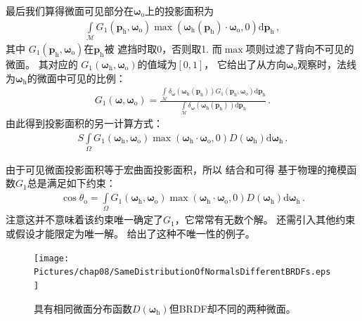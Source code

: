 最后我们算得微面可见部分在${\bm\omega}_{\mathrm{o}}$上的投影面积为
\begin{align}\label{eq:08ex01-AreaProjectionsMicrofacetVisible}
    \int\limits_{\mathcal{M}}G_1({\bm p}_{\mathrm{h}},{\bm\omega}_{\mathrm{o}})
    \max({\bm\omega}_{\mathrm{h}}({\bm p}_{\mathrm{h}})\cdot{\bm\omega}_{\mathrm{o}},0)
    \mathrm{d}{\bm p}_{\mathrm{h}}\, ,
\end{align}
其中
$G_1({\bm p}_{\mathrm{h}},{\bm\omega}_{\mathrm{o}})$在${\bm p}_{\mathrm{h}}$被
遮挡时取0，否则取1. 而$\max$项则过滤了背向不可见的微面。
其对应的
$G_1({\bm\omega}_{\mathrm{h}},{\bm\omega}_{\mathrm{o}})$的值域为$[0,1]$，
它给出了从方向${\bm\omega}_{\mathrm{o}}$观察时，法线为${\bm\omega}_{\mathrm{h}}$的微面中可见的比例：
\begin{align}\label{eq:08ex01-StaticMaskFunc}
    G_1({\bm\omega},{\bm\omega}_{\mathrm{o}})
    =\frac{\displaystyle\int\limits_{\mathcal{M}}
    \delta_{\bm\omega}({\bm\omega}_{\mathrm{h}}({\bm p}_{\mathrm{h}}))
    G_1({\bm p}_{\mathrm{h}},{\bm\omega}_{\mathrm{o}})\mathrm{d}{\bm p}_{\mathrm{h}}}
    {\displaystyle\int\limits_{\mathcal{M}}
    \delta_{\bm\omega}({\bm\omega}_{\mathrm{h}}({\bm p}_{\mathrm{h}}))
    \mathrm{d}{\bm p}_{\mathrm{h}}}\, .
\end{align}
由此得到投影面积的另一计算方式：
\begin{align}
    \label{eq:08ex01-AreaMicrosurface}
    S\int\limits_{\varOmega}G_1({\bm\omega}_{\mathrm{h}},{\bm\omega}_{\mathrm{o}})
    \max({\bm\omega}_{\mathrm{h}}\cdot{\bm\omega}_{\mathrm{o}},0)
    D({\bm\omega}_{\mathrm{h}})\mathrm{d}{\bm\omega}_{\mathrm{h}}\, .
\end{align}

由于可见微面投影面积等于宏曲面投影面积，所以
结合和可得
基于物理的掩模函数$G_1$总是满足如下约束：
\begin{align}\label{eq:08ex01-CosThetaO}
    \cos\theta_{\mathrm{o}}=\int\limits_{\varOmega}
    G_1({\bm\omega}_{\mathrm{h}},{\bm\omega}_{\mathrm{o}})
    \max({\bm\omega}_{\mathrm{h}}\cdot{\bm\omega}_{\mathrm{o}},0)
    D({\bm\omega}_{\mathrm{h}})\mathrm{d}{\bm\omega}_{\mathrm{h}}\, .
\end{align}
注意这并不意味着该约束唯一确定了$G_1$，它常常有无数个解。
还需引入其他约束或假设才能限定为唯一解。
给出了这种不唯一性的例子。
\begin{figure}[htbp]
    \centering
    \texttt{[image: Pictures/chap08/SameDistributionOfNormalsDifferentBRDFs.eps]}
    \caption{具有相同微面分布函数$D({\bm\omega}_{\mathrm{h}})$但BRDF却不同的两种微面。}
    \label{fig:08ex01-SameDistributionOfNormalsDifferentBRDFs}
\end{figure}

